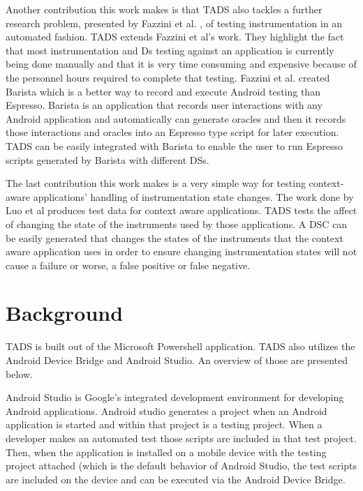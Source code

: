 Another contribution this work makes is that TADS also tackles a further research problem, presented by Fazzini et al. \cite{7927971}, of testing instrumentation in an automated fashion.  TADS extends Fazzini et al's work.  They highlight the fact that most instrumentation and Ds testing against an application is currently being done manually and that it is very time consuming and expensive because of the personnel hours required to complete that testing.  Fazzini et al. created Barista which is a better way to record and execute Android testing than Espresso.  Barista is an application that records user interactions with any Android application and automatically can generate oracles and then it records those interactions and oracles into an Espresso type script for later execution.  TADS can be easily integrated with Barista to enable the user to run Espresso scripts generated by Barista with different DSs.

The last contribution this work makes is a very simple way for testing context-aware applications' handling of instrumentation state changes. The work done by Luo et al \cite{Luo:2017:TLT:3139486.3130945} produces test data for context aware applications.  TADS tests the affect of changing the state of the instruments used by those applications.  A DSC can be easily generated that changes the states of the instruments that the context aware application uses in order to ensure changing instrumentation states will not cause a failure or worse, a false positive or false negative.

\section{Background}
TADS is built out of the Microsoft Powershell application.  TADS also utilizes the Android Device Bridge and Android Studio.  An overview of those are presented below.

Android Studio is Google's integrated development environment for developing Android applications.  Android studio generates a project when an Android application is started and within that project is a testing project.  When a developer makes an automated test those scripts are included in that test project.  Then, when the application is installed on a mobile device with the testing project attached (which is the default behavior of Android Studio, the test scripts are included on the device and can be executed via the Android Device Bridge.  

